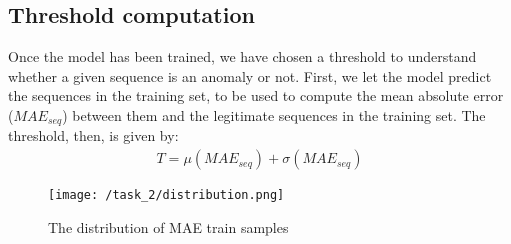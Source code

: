 \documentclass[12pt,a4paper,leqno]{article}
\begin{document}
	\subsection{Threshold computation}
	Once the model has been trained, we have chosen a threshold to understand whether a given sequence is an anomaly or not. First, we let the model predict the sequences in the training set, to be used to compute the mean absolute error ($MAE_{seq}$) between them and the legitimate sequences in the training set. The threshold, then, is given by:\\
	\begin{gather*}
		T = \mu(MAE_{seq}) + \sigma(MAE_{seq})
	\end{gather*}
	\begin{figure}
		\centering
		\texttt{[image: /task\_2/distribution.png]}
		\caption{The distribution of MAE train samples}
		\label{task_2/distribution}
	\end{figure}
	
\end{document}
